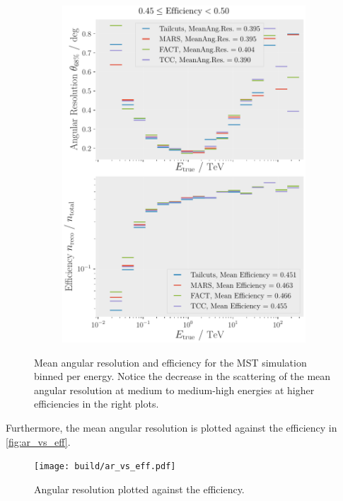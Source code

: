 \begin{figure}
\begin{subfigure}{0.48\textwidth}
        \includegraphics[width=\textwidth]{plots/ar_aeff/AR_Aeff_MST_0.45_0.50.pdf}
    \end{subfigure}
    \caption{Mean angular resolution and efficiency for the MST simulation binned per energy. Notice
    the decrease in the scattering of the mean angular resolution at medium to
    medium-high energies at higher efficiencies in the right plots.}
    \label{fig:efficiency_angres}
\end{figure}

Furthermore, the mean angular resolution is plotted against the efficiency in \autoref{fig:ar_vs_eff}.

\begin{figure}
    \centering
    \texttt{[image: build/ar\_vs\_eff.pdf]}
    \caption{Angular resolution plotted against the efficiency.}
    \label{fig:ar_vs_eff}
\end{figure}


